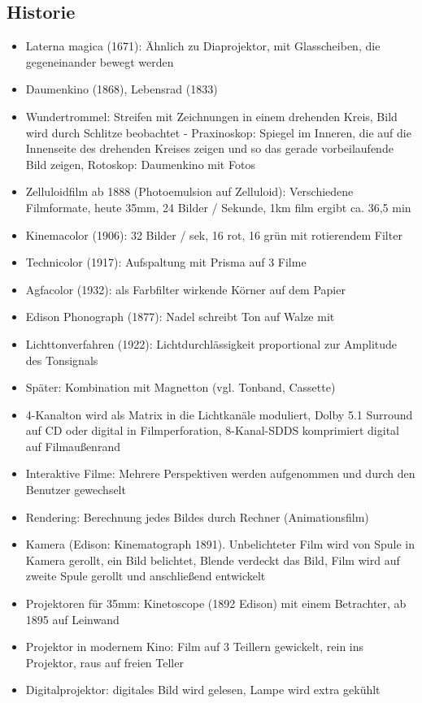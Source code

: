 \documentclass[12pt,landscape]{article}
\begin{document}
\begin{multicols}{3}
\subsection{Historie}
\begin{itemize}
\item Laterna magica (1671): Ähnlich zu Diaprojektor, mit Glasscheiben, die gegeneinander bewegt werden
\item Daumenkino (1868), Lebensrad (1833)
\item Wundertrommel: Streifen mit Zeichnungen in einem drehenden Kreis, Bild wird durch Schlitze beobachtet - Praxinoskop: Spiegel im Inneren, die auf die Innenseite des drehenden Kreises zeigen und so das gerade vorbeilaufende Bild zeigen, Rotoskop: Daumenkino mit Fotos
\item Zelluloidfilm ab 1888 (Photoemulsion auf Zelluloid): Verschiedene Filmformate, heute 35mm, 24 Bilder / Sekunde, 1km film ergibt ca. 36,5 min
\item Kinemacolor (1906): 32 Bilder / sek, 16 rot, 16 grün mit rotierendem Filter
\item Technicolor (1917): Aufspaltung mit Prisma auf 3 Filme
\item Agfacolor (1932): als Farbfilter wirkende Körner auf dem Papier
\item Edison Phonograph (1877): Nadel schreibt Ton auf Walze mit
\item Lichttonverfahren (1922): Lichtdurchlässigkeit proportional zur Amplitude des Tonsignals
\item Später: Kombination mit Magnetton (vgl. Tonband, Cassette)
\item 4-Kanalton wird als Matrix in die Lichtkanäle moduliert, Dolby 5.1 Surround auf CD oder digital in Filmperforation, 8-Kanal-SDDS komprimiert digital auf Filmaußenrand
\item Interaktive Filme: Mehrere Perspektiven werden aufgenommen und durch den Benutzer gewechselt
\item Rendering: Berechnung jedes Bildes durch Rechner (Animationsfilm)
\item Kamera (Edison: Kinematograph 1891). Unbelichteter Film wird von Spule in Kamera gerollt, ein Bild belichtet, Blende verdeckt das Bild, Film wird auf zweite Spule gerollt und anschließend entwickelt
\item Projektoren für 35mm: Kinetoscope (1892 Edison) mit einem Betrachter, ab 1895 auf Leinwand
\item Projektor in modernem Kino: Film auf 3 Teillern gewickelt, rein ins Projektor, raus auf freien Teller
\item Digitalprojektor: digitales Bild wird gelesen, Lampe wird extra gekühlt

\end{itemize}
\end{multicols}
\end{document}
